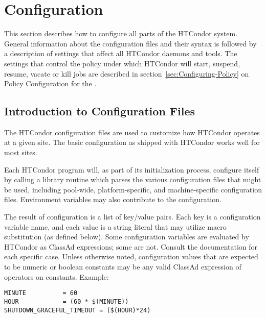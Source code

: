 \section{\label{sec:Configuring-HTCondor}Configuration}


This section describes how to configure all parts of the HTCondor
system.  General information about the configuration
files and their syntax is followed by a description of
settings that affect all
HTCondor daemons and tools.
The 
settings that control the policy under which HTCondor will start,
suspend, resume, vacate or kill jobs
are described in 
section~\ref{sec:Configuring-Policy} on Policy Configuration for the
. 

\subsection{\label{sec:Intro-to-Config-Files}Introduction to
Configuration Files} 

The HTCondor configuration files are used to customize how HTCondor
operates at a given site.  The basic configuration as shipped with
HTCondor works well for most sites.

Each HTCondor program will, as part of its initialization process,
configure itself by calling a library routine which parses the
various configuration files that might be used, including pool-wide,
platform-specific, and machine-specific configuration files.
Environment variables may also contribute to the configuration.

The result of configuration is a list of key/value pairs.
Each key is a configuration variable name,
and each value is a string literal
that may utilize macro substitution (as defined below).
Some configuration variables are evaluated by HTCondor as ClassAd
expressions; some are not.  Consult the documentation for each specific
case.  Unless otherwise noted, configuration values that are expected
to be numeric or boolean constants may be any valid ClassAd expression
of operators on constants.  Example:

\begin{verbatim}
MINUTE          = 60
HOUR            = (60 * $(MINUTE))
SHUTDOWN_GRACEFUL_TIMEOUT = ($(HOUR)*24)
\end{verbatim}

